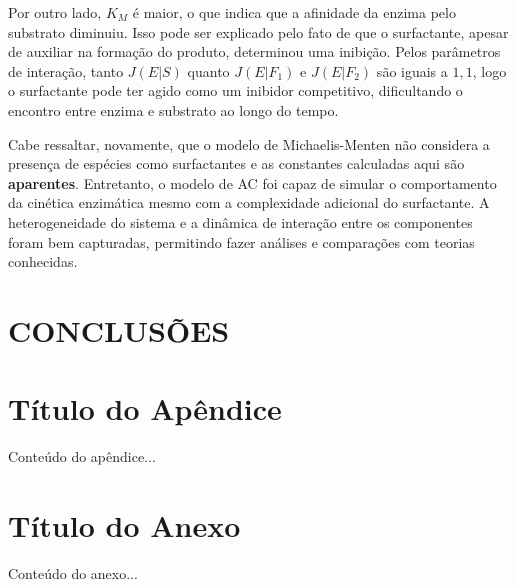 \documentclass[12pt,oneside]{report}
\begin{document}
Por outro lado, $K_M$ é maior, o que indica que a afinidade da enzima pelo substrato diminuiu. Isso pode ser explicado pelo fato de que o surfactante, apesar de auxiliar na formação do produto, determinou uma inibição. Pelos parâmetros de interação, tanto $J (E|S)$ quanto $J (E|F_1)$ e $J (E|F_2)$ são iguais a $1{,}1$, logo o surfactante pode ter
agido como um inibidor competitivo, dificultando o encontro entre enzima e substrato ao longo do tempo.

Cabe ressaltar, novamente, que o modelo de Michaelis-Menten não considera a presença de espécies como surfactantes e as constantes calculadas aqui são \textbf{aparentes}. Entretanto, o modelo de AC foi capaz de simular o comportamento da cinética enzimática mesmo com a complexidade adicional do surfactante. A heterogeneidade do sistema e a dinâmica de interação entre os componentes foram bem capturadas, permitindo fazer análises e comparações com teorias conhecidas.

\chapter{CONCLUSÕES}


\printbibliography[title={REFERÊNCIAS},heading=bibnumbered]

\appendix

\chapter{Título do Apêndice}
Conteúdo do apêndice...

\chapter{Título do Anexo}
Conteúdo do anexo...
\end{document}
